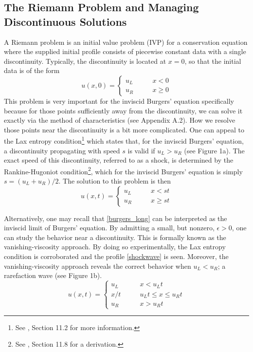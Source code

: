 \documentclass{myproject}
\begin{document}
\subsection{The Riemann Problem and Managing Discontinuous Solutions}
A Riemann problem is an initial value problem (IVP) for a conservation equation where the supplied initial profile consists of piecewise constant data with a single discontinuity. Typically, the discontinuity is located at $x=0$, so that the initial data is of the form
\begin{equation}
    u(x,0) = \begin{cases}
        u_L \qquad & x < 0 \\
        u_R \qquad & x \geq 0
    \end{cases}
\end{equation}
This problem is very important for the inviscid Burgers' equation specifically because for those points sufficiently away from the discontinuity, we can solve it exactly via the method of characteristics (see Appendix A.2). How we resolve those points near the discontinuity is a bit more complicated. One can appeal to the Lax entropy condition\footnote{See \cite{leveque2002}, Section 11.2 for more information.} which states that, for the inviscid Burgers' equation, a discontinuity propagating with speed $s$ is valid if $u_L > u_R$ (see Figure 1a). The exact speed of this discontinuity, referred to as a shock, is determined by the Rankine-Hugoniot condition\footnote{See \cite{leveque2002}, Section 11.8 for a derivation.}, which for the inviscid Burgers' equation is simply $s = (u_L + u_R)/2$. The solution to this problem is then
\begin{equation}\label{shockwave}
    u(x,t) = \begin{cases}
        u_L \qquad & x < st \\
        u_R \qquad & x \geq st
    \end{cases}
\end{equation}

Alternatively, one may recall that \eqref{burgers_long} can be interpreted as the inviscid limit of Burgers' equation. By admitting a small, but nonzero, $\epsilon > 0$, one can study the behavior near a discontinuity. This is formally known as the vanishing-viscosity approach. By doing so experimentally, the Lax entropy condition is corroborated and the profile \eqref{shockwave} is seen. Moreover, the vanishing-viscosity approach reveals the correct behavior when $u_L < u_R$; a rarefaction wave (see Figure 1b). 
\begin{equation}
    u(x,t) = \begin{cases}
        u_L \qquad & x < u_Lt \\
        x/t \qquad & u_Lt \leq x \leq u_Rt \\
        u_R \qquad & x > u_Rt
    \end{cases}
\end{equation}
\end{document}
